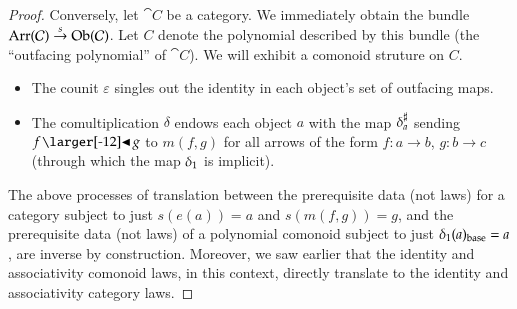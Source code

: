 \documentclass{amsart}
\begin{document}
\begin{proof}
  Conversely, let $\cat{C}$ be a category. We immediately obtain the
  bundle ${\operatorname{Arr}(\mathcal{C})\overset{s}{\to}\operatorname{Ob}(\mathcal{C})}$. Let $C$ denote
  the polynomial described by this bundle (the ``outfacing polynomial''
  of $\cat{C}$). We will exhibit a comonoid struture on $C$.
  \begin{itemize}
  \item The counit $\varepsilon$ singles out the identity in each
    object's set of outfacing maps.
  \item The comultiplication $\delta$ endows each object $a$ with the
    map ${\delta}^\sharp_{a}$ sending $f \subd g$ to $m(f, g)$ for all
    arrows of the form $f: a \to b$, $g: b \to c$ (through which the
    map ${\delta}_1$ is implicit).
  \end{itemize}

  The above processes of translation between the prerequisite data
  (not laws) for a category subject to just $s(e(a)) = a$ and
  $s(m(f, g)) = g$, and the prerequisite data (not laws) of a
  polynomial comonoid subject to just
  ${\delta}_1(a)_{\mathrm{base}} = a$, are inverse by
  construction. Moreover, we saw earlier that the identity and
  associativity comonoid laws, in this context, directly translate
  to the identity and associativity category laws.
\end{proof}
\end{document}
